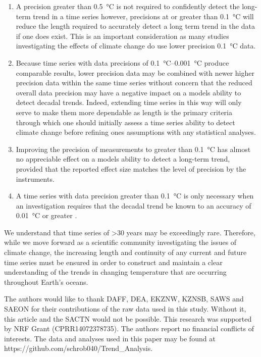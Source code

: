 \documentclass[]{ametsoc}
\begin{document}
\begin{enumerate}
\item A precision greater than \SI{0.5}{\degreeCelsius} is not required to confidently detect the long-term trend in a time series however, precisions at or greater than \SI{0.1}{\degreeCelsius} will reduce the length required to accurately detect a long term trend in the data if one does exist. This is an important consideration as many studies investigating the effects of climate change \citep[e.g.][]{Grant2010, Scherrer2010, Lathlean2012} do use lower precision \SI{0.1}{\degreeCelsius} data. 

\item Because time series with data precisions of \SIrange{0.1}{0.001}{\degreeCelsius} produce comparable results, lower precision data may be combined with newer higher precision data within the same time series without concern that the reduced overall data precision may have a negative impact on a models ability to detect decadal trends. Indeed, extending time series in this way will only serve to make them more dependable as length is the primary criteria through which one should initially assess a time series ability to detect climate change before refining ones assumptions with any statistical analyses.

\item Improving the precision of measurements to greater than \SI{0.1}{\degreeCelsius} has almost no appreciable effect on a models ability to detect a long-term trend, provided that the reported effect size matches the level of precision by the instruments.

\item A time series with data precision greater than \SI{0.1}{\degreeCelsius} is only necessary when an investigation requires that the decadal trend be known to an accuracy of \SI{0.01}{\degreeCelsius} or greater \citep{Karl2015}. 
\end{enumerate}

We understand that time series of \textgreater 30 years may be exceedingly rare. Therefore, while we move forward as a scientific community investigating the issues of climate change, the increasing length and continuity of any current and future time series must be ensured in order to construct and maintain a clear understanding of the trends in changing temperature that are occurring throughout Earth's oceans.

%

\acknowledgments
The authors would like to thank DAFF, DEA, EKZNW, KZNSB, SAWS and SAEON for their contributions of the raw data used in this study. Without it, this article and the SACTN would not be possible. This research was supported by NRF Grant (CPRR14072378735). The authors report no financial conflicts of interests. The data and analyses used in this paper may be found at https://github.com/schrob040/Trend\_Analysis.
\end{document}

